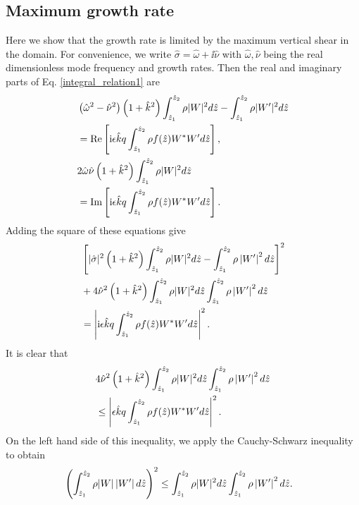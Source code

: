 \subsection{Maximum growth rate}   
Here we show that the growth rate is limited by the maximum vertical
shear in the domain. For convenience, we write $\hat{\sigma} = \hat{\omega} +
\ii\hat{\nu}$ with $\hat{\omega},\hat{\nu}$ being the real dimensionless
mode frequency and growth rates. Then the real and imaginary parts of
Eq. \ref{integral_relation1} are
\begin{align}
  &\left(\hat{\omega}^2-\hat{\nu}^2\right)\left(1+\hat{k}^2\right)
  \int_{\hat{z}_1}^{\hat{z}_2}\rho|W|^2d\hat{z} -
  \int_{\hat{z}_1}^{\hat{z}_2}\rho|W^\prime|^2d\hat{z}
  \notag\\
  &=\operatorname{Re}\left[\mathrm{i}
    \epsilon\hat{k}q \int_{\hat{z}_1}^{\hat{z}_2}\rho
    f(\hat{z}) W^*W^\prime d\hat{z}\right], \notag\\
& 2\hat{\omega}\hat{\nu}\left(1+\hat{k}^2\right)
   \int_{\hat{z}_1}^{\hat{z}_2}\rho|W|^2d\hat{z}\notag\\
   &=\operatorname{Im}\left[\mathrm{i}
     \epsilon\hat{k}q \int_{\hat{z}_1}^{\hat{z}_2}\rho
     f(\hat{z}) W^*W^\prime d\hat{z}\right].
\end{align}
Adding the square of these equations give
\begin{align}
&\left[|\hat{\sigma}|^2\left(1+\hat{k}^2\right)
   \int_{\hat{z}_1}^{\hat{z}_2}\rho|W|^2d\hat{z} -
  \int_{\hat{z}_1}^{\hat{z}_2}\rho\left|W^\prime \right|^2d\hat{z}\right]^2\notag\\
&+4\hat{\nu}^2\left(1+\hat{k}^2\right) 
  \int_{\hat{z}_1}^{\hat{z}_2}\rho
   |W|^2d\hat{z}\int_{\hat{z}_1}^{\hat{z}_2}\rho\left|W^\prime \right|^2d\hat{z}\notag\\
   &=\left|\mathrm{i}
  \epsilon\hat{k}q\int_{\hat{z}_1}^{\hat{z}_2}\rho
 f(\hat{z}) W^*W^\prime d\hat{z}\right|^2.
\end{align}
It is clear that
\begin{align}\label{sigma_finite_domain} 
&4\hat{\nu}^2\left(1+\hat{k}^2\right) 
  \int_{\hat{z}_1}^{\hat{z}_2}\rho
   |W|^2d\hat{z}\int_{\hat{z}_1}^{\hat{z}_2}\rho\left|W^\prime \right|^2d\hat{z}\notag\\
   &\leq\left|
  \epsilon\hat{k}q\int_{\hat{z}_1}^{\hat{z}_2}\rho
 f(\hat{z}) W^*W^\prime d\hat{z}\right|^2.
\end{align}
On the left hand side of this inequality, we apply the Cauchy-Schwarz
inequality to obtain
\begin{align}
  &\left( \int_{\hat{z}_1}^{\hat{z}_2}\rho
    |W|\left|W^\prime \right|d\hat{z}\right)^2\leq
  \int_{\hat{z}_1}^{\hat{z}_2}\rho 
  |W|^2d\hat{z}\int_{\hat{z}_1}^{\hat{z}_2}\rho\left|W^\prime \right|^2d\hat{z}.
\end{align}
